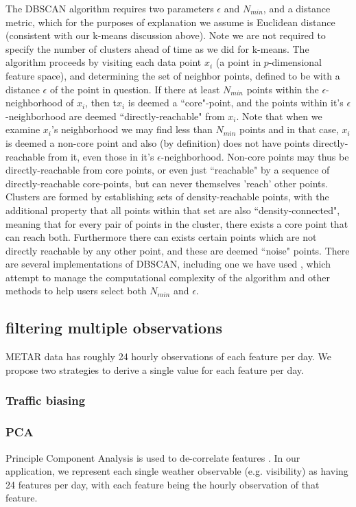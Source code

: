 \documentclass[11pt]{amsart}
\begin{document}
The DBSCAN algorithm requires two parameters $\epsilon$ and $N_{min}$, and a distance metric, which for the purposes of explanation we assume is Euclidean distance (consistent with our k-means discussion above).  Note we are not required to specify the number of clusters ahead of time as we did for k-means.  The algorithm proceeds by visiting each data point $x_i$ (a point in $p$-dimensional feature space), and determining the set of neighbor points, defined to be with a distance $\epsilon$ of the point in question.  If there at least $N_{min}$ points within the $\epsilon$-neighborhood of $x_i$, then t$x_i$ is deemed a ``core"-point, and the points within it's $\epsilon$-neighborhood are deemed ``directly-reachable" from $x_i$.  Note that when we examine $x_i$'s neighborhood we may find less than $N_{min}$ points and in that case, $x_i$ is deemed a non-core point and also (by definition) does not have points directly-reachable from it, even those in it's $\epsilon$-neighborhood.  Non-core points may thus be directly-reachable from core points, or even just ``reachable" by a sequence of directly-reachable core-points, but can never themselves 'reach' other points.  Clusters are formed by establishing sets of density-reachable points, with the additional property that all points within that set are also ``density-connected", meaning that for every pair of points in the cluster, there exists a core point that can reach both.  Furthermore there can exists certain points which are not directly reachable by any other point, and these are deemed ``noise" points.  There are several implementations of DBSCAN, including one we have used \cite{scikit-learn}, which attempt to manage the computational complexity of the algorithm and other methods to help users select both $N_{min}$ and $\epsilon$.    


\subsection{filtering multiple observations}
METAR data has roughly 24 hourly observations of each feature per day. We propose two strategies to derive a single value for each feature per day.

\subsubsection{Traffic biasing}


\subsubsection{PCA}
Principle Component Analysis is used to de-correlate features \cite{orfanidis2007svd}.  In our application, we represent each single weather observable (e.g. visibility) as having 24 features per day, with each feature being the hourly observation of that feature.  
\end{document}
